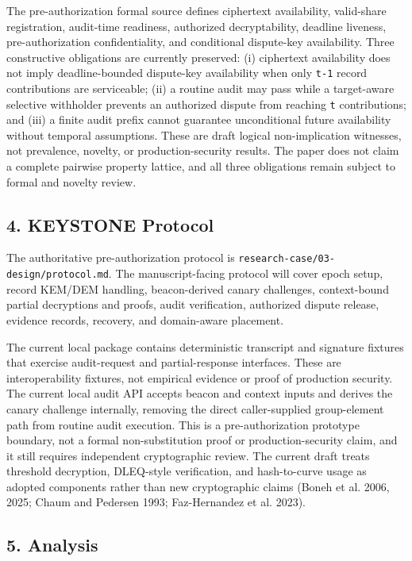 \documentclass[
]{article}
\begin{document}
The pre-authorization formal source defines ciphertext availability,
valid-share registration, audit-time readiness, authorized
decryptability, deadline liveness, pre-authorization confidentiality,
and conditional dispute-key availability. Three constructive obligations
are currently preserved: (i) ciphertext availability does not imply
deadline-bounded dispute-key availability when only \texttt{t-1} record
contributions are serviceable; (ii) a routine audit may pass while a
target-aware selective withholder prevents an authorized dispute from
reaching \texttt{t} contributions; and (iii) a finite audit prefix
cannot guarantee unconditional future availability without temporal
assumptions. These are draft logical non-implication witnesses, not
prevalence, novelty, or production-security results. The paper does not
claim a complete pairwise property lattice, and all three obligations
remain subject to formal and novelty review.

\subsection{4. KEYSTONE Protocol}\label{keystone-protocol}

The authoritative pre-authorization protocol is
\texttt{research-case/03-design/protocol.md}. The manuscript-facing
protocol will cover epoch setup, record KEM/DEM handling, beacon-derived
canary challenges, context-bound partial decryptions and proofs, audit
verification, authorized dispute release, evidence records, recovery,
and domain-aware placement.

The current local package contains deterministic transcript and
signature fixtures that exercise audit-request and partial-response
interfaces. These are interoperability fixtures, not empirical evidence
or proof of production security. The current local audit API accepts
beacon and context inputs and derives the canary challenge internally,
removing the direct caller-supplied group-element path from routine
audit execution. This is a pre-authorization prototype boundary, not a
formal non-substitution proof or production-security claim, and it still
requires independent cryptographic review. The current draft treats
threshold decryption, DLEQ-style verification, and hash-to-curve usage
as adopted components rather than new cryptographic claims (Boneh et al.
2006, 2025; Chaum and Pedersen 1993; Faz-Hernandez et al. 2023).

\subsection{5. Analysis}\label{analysis}
\end{document}
